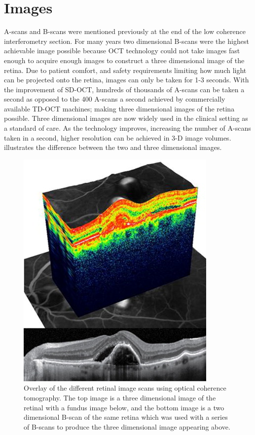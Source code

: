 \section{Images}
A-scans and B-scans were mentioned previously at the end of the low
coherence interferometry section.  For many years two dimensional B-scans were
the highest achievable image possible because OCT technology could not take
images fast enough to acquire enough images to construct a three dimensional
image of the retina.  Due to patient comfort, and safety requirements limiting how
much light can be projected onto the retina, images can only be taken for 1-3 seconds. \cite{mbib_4} With the improvement of SD-OCT, hundreds of thousands
of A-scans can be taken a second as opposed to the 400 A-scans a second achieved by
commercially available TD-OCT machines; making three dimensional images of the retina
possible.\cite{mbib_4}  Three dimensional images are now widely used in the clinical
setting as a standard of care.  As the technology improves, increasing the number of
A-scans taken in a second, higher resolution can be achieved in 3-D image volumes.\cite{mbib_4}   illustrates the difference between the two 
and three dimensional images.

\begin{figure}[htbp]
\centering
\includegraphics{figures/morgan_9}
\caption{ Overlay of the different retinal image scans using optical coherence tomography. The top image is a three dimensional image of the retinal with a fundus image below, and the bottom image is a two dimensional B-scan of the same retina which was used with a series of B-scans to produce the three dimensional image appearing above. \cite{mbib_13} }
\label{fig:m_9}
\end{figure}

